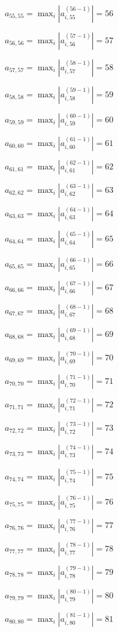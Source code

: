 \documentclass[a4paper,12pt]{article}
\begin{document}
$a _{ 55, 55 } =  \max _i |a _{ i, 55 } ^{ (56 - 1) } | = 56$

$a _{ 56, 56 } =  \max _i |a _{ i, 56 } ^{ (57 - 1) } | = 57$

$a _{ 57, 57 } =  \max _i |a _{ i, 57 } ^{ (58 - 1) } | = 58$

$a _{ 58, 58 } =  \max _i |a _{ i, 58 } ^{ (59 - 1) } | = 59$

$a _{ 59, 59 } =  \max _i |a _{ i, 59 } ^{ (60 - 1) } | = 60$

$a _{ 60, 60 } =  \max _i |a _{ i, 60 } ^{ (61 - 1) } | = 61$

$a _{ 61, 61 } =  \max _i |a _{ i, 61 } ^{ (62 - 1) } | = 62$

$a _{ 62, 62 } =  \max _i |a _{ i, 62 } ^{ (63 - 1) } | = 63$

$a _{ 63, 63 } =  \max _i |a _{ i, 63 } ^{ (64 - 1) } | = 64$

$a _{ 64, 64 } =  \max _i |a _{ i, 64 } ^{ (65 - 1) } | = 65$

$a _{ 65, 65 } =  \max _i |a _{ i, 65 } ^{ (66 - 1) } | = 66$

$a _{ 66, 66 } =  \max _i |a _{ i, 66 } ^{ (67 - 1) } | = 67$

$a _{ 67, 67 } =  \max _i |a _{ i, 67 } ^{ (68 - 1) } | = 68$

$a _{ 68, 68 } =  \max _i |a _{ i, 68 } ^{ (69 - 1) } | = 69$

$a _{ 69, 69 } =  \max _i |a _{ i, 69 } ^{ (70 - 1) } | = 70$

$a _{ 70, 70 } =  \max _i |a _{ i, 70 } ^{ (71 - 1) } | = 71$

$a _{ 71, 71 } =  \max _i |a _{ i, 71 } ^{ (72 - 1) } | = 72$

$a _{ 72, 72 } =  \max _i |a _{ i, 72 } ^{ (73 - 1) } | = 73$

$a _{ 73, 73 } =  \max _i |a _{ i, 73 } ^{ (74 - 1) } | = 74$

$a _{ 74, 74 } =  \max _i |a _{ i, 74 } ^{ (75 - 1) } | = 75$

$a _{ 75, 75 } =  \max _i |a _{ i, 75 } ^{ (76 - 1) } | = 76$

$a _{ 76, 76 } =  \max _i |a _{ i, 76 } ^{ (77 - 1) } | = 77$

$a _{ 77, 77 } =  \max _i |a _{ i, 77 } ^{ (78 - 1) } | = 78$

$a _{ 78, 78 } =  \max _i |a _{ i, 78 } ^{ (79 - 1) } | = 79$

$a _{ 79, 79 } =  \max _i |a _{ i, 79 } ^{ (80 - 1) } | = 80$

$a _{ 80, 80 } =  \max _i |a _{ i, 80 } ^{ (81 - 1) } | = 81$
\end{document}
